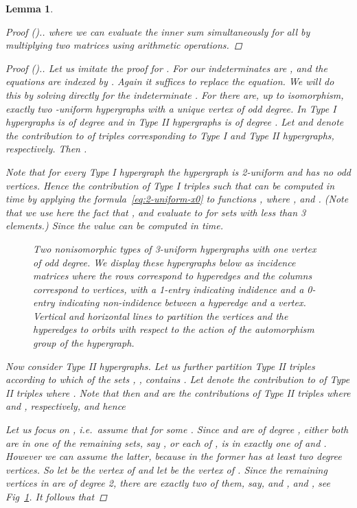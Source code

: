 \documentclass{amsart}
\newtheorem{Lem}{Lemma}
\begin{document}
\begin{Lem}
\begin{proof}[Proof ().]
where we can evaluate the inner sum simultaneously for all  
by multiplying two  matrices using 
arithmetic operations.
\end{proof}

\begin{proof}[Proof ().]
Let us imitate the proof for .
For  our indeterminates are , and the
equations are indexed by . Again it suffices to replace
the  equation. We will do this by solving directly for
the indeterminate . For  there are, up to isomorphism, 
exactly two -uniform hypergraphs  with a unique vertex 
of odd degree. 
In Type I hypergraphs  is of degree  and in Type II hypergraphs  is of degree . 
Let  and  denote the contribution to  of triples  corresponding to Type I and Type II hypergraphs, respectively.
Then .

Note that for every Type I hypergraph the hypergraph  is 2-uniform and has no odd vertices.
Hence the contribution  of Type I triples such that  can be computed in time  by applying the formula~\eqref{eq:2-uniform-x0} to functions , where ,  and . (Note that we use here the fact that ,  and  evaluate to  for sets with less than 3 elements.)
Since 
the value  can be computed in  time.

\begin{figure}[t]

\caption{\label{fig:3-uniform}Two nonisomorphic types of 3-uniform hypergraphs with one vertex of odd degree.
We display these hypergraphs below as incidence matrices
where the rows correspond to hyperedges and the columns correspond
to vertices, with a 1-entry indicating indidence and a 0-entry 
indicating non-indidence between a hyperedge and a vertex.
Vertical and horizontal lines to partition the vertices and 
the hyperedges to orbits with respect to the action of the automorphism 
group of the hypergraph.}
\end{figure}

Now consider Type II hypergraphs. 
Let us further partition Type II triples  according to which of the sets , ,  contains .
Let  denote the contribution to  of Type II triples where .
Note that then  and  are the contributions of Type II triples where  and , respectively, and hence 


Let us focus on , i.e.\ assume that  for some .
Since  and  are of degree , either both are in one of the remaining sets, say , or each of ,  is in exactly one of  and .
However we can assume the latter, because in the former  has at least two degree  vertices.
So let  be the vertex of  and let  be the vertex of .
Since the remaining vertices in  are of degree 2, there are exactly two of them, say,  and , and , see Fig~\ref{fig:3-uniform}. It follows that 



\end{proof}
\end{Lem}
\end{document}
